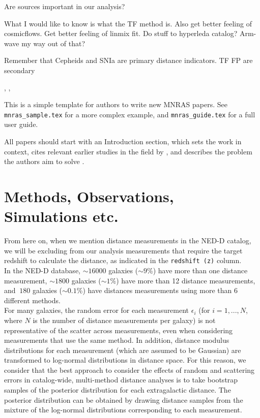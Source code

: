 \documentclass[a4paper,fleqn,usenatbib]{mnras}
\begin{document}
Are \citet{2mass} sources important in our analysis?

What I would like to know is what the TF method is. Also get better feeling of cosmicflows. Get better feeling of linmix fit. Do stuff to hyperleda catalog? Arm-wave my way out of that?

Remember that Cepheids and SNIa are primary distance indicators. TF FP are secondary 


\citet{tf07dist}



 \citet{chaparro18}, \citet{tecciencia}, \citet{gelmanppd} \citet{brooks} \citet{tforig}



This is a simple template for authors to write new MNRAS papers.
See \texttt{mnras\_sample.tex} for a more complex example, and \texttt{mnras\_guide.tex}
for a full user guide.

All papers should start with an Introduction section, which sets the work
in context, cites relevant earlier studies in the field by \citet{photred2},
and describes the problem the authors aim to solve \citep[e.g.][]{photred1}.

\section{Methods, Observations, Simulations etc.}

From here on, when we mention distance measurements in the NED-D catalog, we will be excluding from our analysis measurements that require the target redshift to calculate the distance, as indicated in the \texttt{redshift (z)} column.\\

In the NED-D database, $\sim16000$ galaxies ($\sim9$\%) have more than one distance measurement, $\sim1800$ galaxies ($\sim1$\%) have more than 12  distance measurements, and $~180$ galaxies ($\sim0.1$\%) have distances measurements using more than 6 different methods. \\

For many galaxies, the random error for each measurement $\epsilon_i$ (for $i=1,...,N$, where $N$ is the number of distance measurements per galaxy) is not representative of the scatter across measurements, even when considering measurements that use the same method. In addition, distance modulus distributions for each measurement (which are assumed to be Gaussian) are transformed to log-normal distributions in distance space. For this reason, we consider that the best approach to consider the effects of random and scattering errors in catalog-wide, multi-method distance analyses is to take bootstrap samples of the posterior distribution for each extragalactic distance. The posterior distribution can be obtained by drawing distance samples from the mixture of the log-normal distributions corresponding to each measurement.\\
\end{document}
